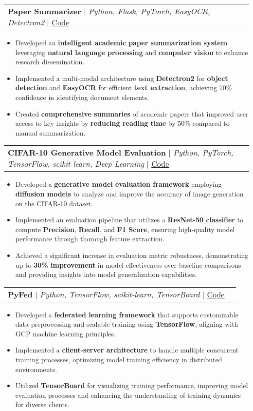 \documentclass[letterpaper,11pt]{article}
\makeatletter
\newcommand{\resumeItem}[1]{
  \item\small{
    #1 \vspace{0pt}
  }
}
\newcommand{\resumeProjectHeading}[2]{
    \item
    \begin{tabular*}{0.97\textwidth}{l@{\extracolsep{\fill}}r}
      \small#1 & #2 \\
    \end{tabular*}\vspace{-3pt}
}
\newcommand{\resumeItemListStart}{\begin{itemize}}
\newcommand{\resumeItemListEnd}{\end{itemize}\vspace{-5pt}}
\makeatother
\begin{document}
\resumeProjectHeading
    {\textbf{Paper Summarizer} $|$ \emph{Python, Flask, PyTorch, EasyOCR, Detectron2} $|$ \href{https://github.com/amirrezaskh/paper-summarizer}{\underline{Code}}} {}
    \resumeItemListStart
        \resumeItem{Developed an \textbf{intelligent academic paper summarization system} leveraging \textbf{natural language processing} and \textbf{computer vision} to enhance research dissemination.}
        \resumeItem{Implemented a multi-modal architecture using \textbf{Detectron2} for \textbf{object detection} and \textbf{EasyOCR} for efficient \textbf{text extraction}, achieving 70\% confidence in identifying document elements.}
        \resumeItem{Created \textbf{comprehensive summaries} of academic papers that improved user access to key insights by \textbf{reducing reading time} by 50\% compared to manual summarization.}
    \resumeItemListEnd

\resumeProjectHeading
    {\textbf{CIFAR-10 Generative Model Evaluation} $|$ \emph{Python, PyTorch, TensorFlow, scikit-learn, Deep Learning} $|$ \href{https://github.com/amirrezaskh/Unified-Image-Evaluation-Metric}{\underline{Code}}} {}
    \resumeItemListStart
        \resumeItem{Developed a \textbf{generative model evaluation framework} employing \textbf{diffusion models} to analyze and improve the accuracy of image generation on the CIFAR-10 dataset.}
        \resumeItem{Implemented an evaluation pipeline that utilizes a \textbf{ResNet-50 classifier} to compute \textbf{Precision}, \textbf{Recall}, and \textbf{F1 Score}, ensuring high-quality model performance through thorough feature extraction.}
        \resumeItem{Achieved a significant increase in evaluation metric robustness, demonstrating up to \textbf{30\% improvement} in model effectiveness over baseline comparisons and providing insights into model generalization capabilities.}
    \resumeItemListEnd

\resumeProjectHeading
    {\textbf{PyFed} $|$ \emph{Python, TensorFlow, scikit-learn, TensorBoard} $|$ \href{https://github.com/amirrezaskh/PyFed}{\underline{Code}}} {}
    \resumeItemListStart
        \resumeItem{Developed a \textbf{federated learning framework} that supports customizable data preprocessing and scalable training using \textbf{TensorFlow}, aligning with GCP machine learning principles.}
        \resumeItem{Implemented a \textbf{client-server architecture} to handle multiple concurrent training processes, optimizing model training efficiency in distributed environments.}
        \resumeItem{Utilized \textbf{TensorBoard} for visualizing training performance, improving model evaluation processes and enhancing the understanding of training dynamics for diverse clients.}
    \resumeItemListEnd
\end{document}
